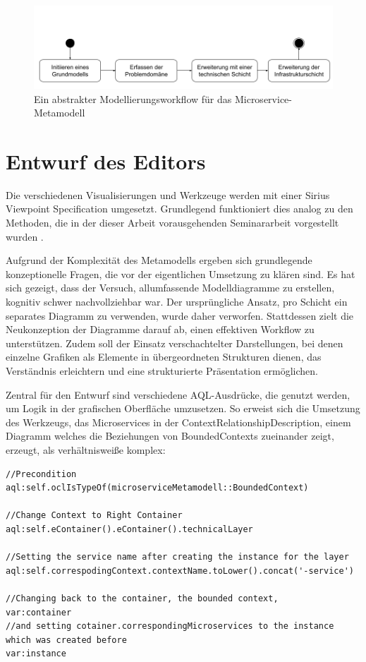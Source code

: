 \begin{figure}[ht]
\centering
\includegraphics[width=\textwidth]{bilder/k5/workflow1.png}
\caption{Ein abstrakter Modellierungsworkflow für das Microservice-Metamodell}
\end{figure}


\newpage
\section{Entwurf des Editors}

Die verschiedenen Visualisierungen und Werkzeuge werden mit einer \glqq Sirius Viewpoint Specification\grqq{} umgesetzt. Grundlegend funktioniert dies analog zu den Methoden, die in der dieser Arbeit vorausgehenden Seminararbeit vorgestellt wurden \cite[S.11-13]{loeffler}.

Aufgrund der Komplexität des Metamodells ergeben sich grundlegende konzeptionelle Fragen, die vor der eigentlichen Umsetzung zu klären sind. Es hat sich gezeigt, dass der Versuch, allumfassende Modelldiagramme zu erstellen, kognitiv schwer nachvollziehbar war. Der ursprüngliche Ansatz, pro Schicht ein separates Diagramm zu verwenden, wurde daher verworfen. Stattdessen zielt die Neukonzeption der Diagramme darauf ab, einen effektiven Workflow zu unterstützen. Zudem soll der Einsatz verschachtelter Darstellungen, bei denen einzelne Grafiken als Elemente in übergeordneten Strukturen dienen, das Verständnis erleichtern und eine strukturierte Präsentation ermöglichen.

Zentral für den Entwurf sind verschiedene AQL-Ausdrücke, die genutzt werden, um Logik in der grafischen Oberfläche umzusetzen. So erweist sich die Umsetzung des Werkzeugs, das Microservices in der \glqq ContextRelationshipDescription\grqq{}, einem Diagramm welches die Beziehungen von BoundedContexts zueinander zeigt, erzeugt, als verhältnisweiße komplex:

\begin{lstlisting}[caption=Erzeugen eines Microservices als Border Node an einem Bounded Context]
//Precondition
aql:self.oclIsTypeOf(microserviceMetamodell::BoundedContext)

//Change Context to Right Container
aql:self.eContainer().eContainer().technicalLayer

//Setting the service name after creating the instance for the layer
aql:self.correspodingContext.contextName.toLower().concat('-service')

//Changing back to the container, the bounded context,
var:container
//and setting cotainer.correspondingMicroservices to the instance which was created before
var:instance
\end{lstlisting}

